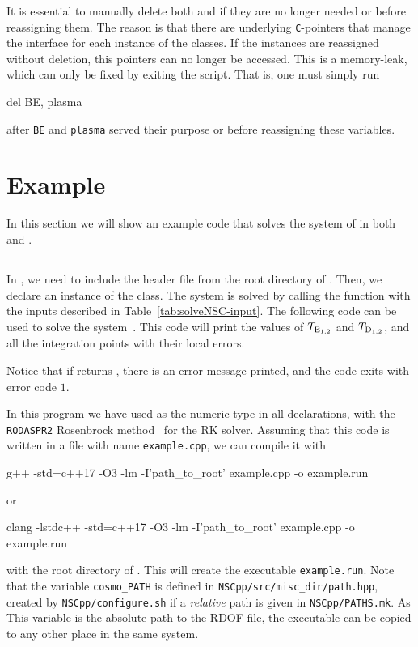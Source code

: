 \documentclass[11pt,a4paper]{article}
\begin{document}
It is essential to manually delete both  and  if they are no longer needed or before reassigning them. The reason is that there are underlying {\tt C}-pointers that manage the \PY interface for each instance of the classes. If the instances are reassigned without deletion, this pointers can no longer be accessed. This is a memory-leak, which can only be fixed by exiting the script. 
%
That is, one must simply run 
%
\begin{py}
	del BE, plasma
\end{py}  
%
after {\tt BE} and {\tt plasma} served their purpose or before reassigning these variables.

\section{Example}\label{sec:example}
\setcounter{equation}{0}
%
In this section we will show an example code that solves the system of  in both \CPP and \PY.
%
\subsection{\CPP}
%
In \CPP, we need to include the header file  from the root directory of \nsc. Then, we declare an instance of the  class. The system is solved by calling the  function with the inputs described in Table~\ref{tab:solveNSC-input}. The following code can be used to solve the system~. This code will print the values of $T_{\rm E_{1,2}}$ and $T_{\rm D_{1,2}}$, and all the integration points with their local errors.
%
\lstset{language = c++}

%
Notice that if  returns , there is an error message printed, and the code exits  with error code $1$.

In this program we have used  as the numeric type in all declarations, with the {\tt RODASPR2} Rosenbrock method~\cite{RangAngermann2005} for the RK solver. Assuming that this code is written in a file with name {\tt example.cpp}, we can compile it with 
%
\begin{bash}
	g++ -std=c++17 -O3 -lm -I'path_to_root' example.cpp -o example.run	
\end{bash}
%
or
\begin{bash}
	clang -lstdc++ -std=c++17 -O3 -lm -I'path_to_root' example.cpp -o example.run	
\end{bash}
%
with  the root directory of \nsc. This will create the executable {\tt example.run}. Note that the variable {\tt cosmo\_PATH} is defined in {\tt NSCpp/src/misc\_dir/path.hpp}, created by {\tt NSCpp/configure.sh} if a {\em relative} path is given in {\tt NSCpp/PATHS.mk}. As This variable is the absolute path to the RDOF file, the executable can be copied to any other place in the same system.
\end{document}
